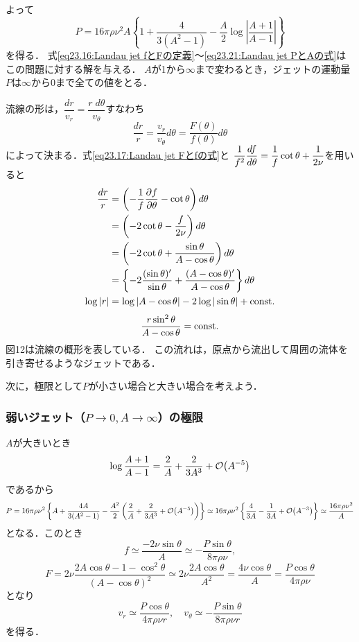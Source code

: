 よって
\begin{equation}\label{eq23.21:Landau jet PとAの式}
    P = 16\pi\rho\nu^2 A \left\{ 1 + \frac{4}{3(A^2-1)} - \frac{A}{2} \log \left| \frac{A+1}{A-1} \right| \right\} 
\end{equation}
を得る．
式\eqref{eq23.16:Landau jet fとFの定義}〜\eqref{eq23.21:Landau jet PとAの式}はこの問題に対する解を与える．
$A$が1から$\infty$まで変わるとき，ジェットの運動量$P$は$\infty$から0まで全ての値をとる．


流線の形は，$\dfrac{dr}{v_r} = \dfrac{r \; d\theta}{v_\theta}$すなわち
\[
    \frac{dr}{r} = \frac{v_r}{v_\theta} d\theta = \frac{F(\theta)}{f(\theta)} d\theta
\]
によって決まる．式\eqref{eq23.17:Landau jet Fとfの式}と
$\dfrac{1}{f^2} \ddv{f}{\theta} = \dfrac{1}{f} \cot\theta + \dfrac{1}{2\nu}$を用いると
\begin{align*}
    \frac{dr}{r} &= \left( -\frac{1}{f} \pdv{f}{\theta} - \cot\theta \right) d\theta \\
    &= \left( -2\cot\theta - \frac{f}{2\nu} \right) d\theta \\
    &= \left( -2\cot\theta + \frac{\sin\theta}{A-\cos\theta} \right) d\theta \\
    &= \left\{ -2 \frac{(\sin\theta)'}{\sin\theta} + \frac{(A-\cos\theta)'}{A-\cos\theta} \right\} d\theta \\
    \log |r| &= \log |A-\cos\theta| -2 \log |\sin\theta| + \mathrm{const.} 
\end{align*}
\begin{equation}
    \frac{r\sin^2\theta}{A-\cos\theta} = \mathrm{const.}
\end{equation}
図12は流線の概形を表している．
この流れは，原点から流出して周囲の流体を引き寄せるようなジェットである．


次に，極限として$P$が小さい場合と大きい場合を考えよう．


\subsubsection*{弱いジェット（$P\to0, A\to\infty$）の極限}

$A$が大きいとき
\[
    \log \frac{A+1}{A-1} = \frac{2}{A}+ \frac{2}{3A^3} + \order{A^{-5}}
\]
であるから
\[
    P = 16\pi\rho\nu^2 \left\{ A + \frac{4A}{3(A^2-1)} - \frac{A^2}{2} \left( \frac{2}{A}+ \frac{2}{3A^3} + \order{A^{-5}} \right) \right\} 
    \simeq 16\pi\rho\nu^2 \left\{ \frac{4}{3A} - \frac{1}{3A} + \order{A^{-3}} \right\} 
    \simeq \frac{16\pi\rho\nu^2}{A}
\]
となる．このとき
\[
    f \simeq \frac{-2\nu\sin\theta}{A} \simeq -\frac{P\sin\theta}{8\pi\rho\nu} ,
\]
\[
    F = 2\nu \frac{2A\cos\theta-1-\cos^2\theta}{(A-\cos\theta)^2} \simeq 2\nu \frac{2A\cos\theta}{A^2}
    = \frac{4\nu\cos\theta}{A} = \frac{P\cos\theta}{4\pi\rho\nu}
\]
となり
\begin{equation}
    v_r \simeq \frac{P\cos\theta}{4\pi\rho\nu r}, \quad
    v_\theta \simeq - \frac{P\sin\theta}{8\pi\rho\nu r}
\end{equation}
を得る．



